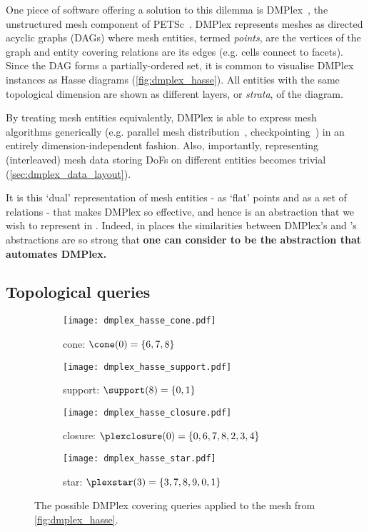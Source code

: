 \documentclass[thesis]{subfiles}
\begin{document}
One piece of software offering a solution to this dilemma is DMPlex~\cite{knepleyMeshAlgorithmsPDE2009,knepleyUnstructuredOverlappingMesh2015,langeEfficientMeshManagement2016}, the unstructured mesh component of PETSc~\cite{petsc-efficient,petsc-user-ref,petsc-web-page}.
DMPlex represents meshes as directed acyclic graphs (DAGs) where mesh entities, termed \emph{points}, are the vertices of the graph and entity covering relations are its edges (e.g. cells connect to facets).
Since the DAG forms a partially-ordered set, it is common to visualise DMPlex instances as Hasse diagrams (\cref{fig:dmplex_hasse}).
All entities with the same topological dimension are shown as different layers, or \emph{strata}, of the diagram.

By treating mesh entities equivalently, DMPlex is able to express mesh algorithms generically (e.g. parallel mesh distribution~\cite{knepleyUnstructuredOverlappingMesh2015}, checkpointing~\cite{hamEfficientNtoMCheckpointing2024}) in an entirely dimension-independent fashion.
Also, importantly, representing (interleaved) mesh data storing DoFs on different entities becomes trivial (\cref{sec:dmplex_data_layout}).

It is this `dual' representation of mesh entities - as `flat' points and as a set of relations - that makes DMPlex so effective, and hence is an abstraction that we wish to represent in .
Indeed, in places the similarities between DMPlex's and 's abstractions are so strong that \textbf{one can consider  to be the abstraction that automates DMPlex.}

\subsection{Topological queries}
\label{sec:dmplex_queries}

\begin{figure}
  \centering
  \begin{subfigure}{.49\textwidth}
    \centering
    \texttt{[image: dmplex\_hasse\_cone.pdf]}
    \caption{cone: $\cone(0) = \{6,7,8\}$}
  \end{subfigure}
  \begin{subfigure}{.49\textwidth}
    \centering
    \texttt{[image: dmplex\_hasse\_support.pdf]}
    \caption{support: $\support(8) = \{0,1\}$}
  \end{subfigure}

  \vspace{1em}

  \begin{subfigure}{.49\textwidth}
    \centering
    \texttt{[image: dmplex\_hasse\_closure.pdf]}
    \caption{closure: $\plexclosure(0) = \{0,6,7,8,2,3,4\}$}
  \end{subfigure}
  \begin{subfigure}{.49\textwidth}
    \centering
    \texttt{[image: dmplex\_hasse\_star.pdf]}
    \caption{star: $\plexstar(3) = \{3,7,8,9,0,1\}$}
  \end{subfigure}

  \caption{
    The possible DMPlex covering queries applied to the mesh from \cref{fig:dmplex_hasse}.
  }
  \label{fig:dmplex_queries}
\end{figure}
\end{document}

